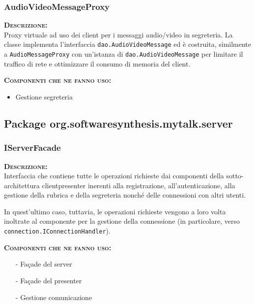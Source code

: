 \subsubsection{AudioVideoMessageProxy}
\begin{description}
	\item{\scshape\bfseries Descrizione:}\\
Proxy virtuale ad uso dei client per i messaggi audio/video in segreteria. La classe implementa l'interfaccia \texttt{dao.AudioVideoMessage} ed è costruita, similmente a \texttt{AudioMessageProxy} con un'istanza di \texttt{dao.AudioVideoMessage} per limitare il traffico di rete e ottimizzare il consumo di memoria del client.
	\item{\scshape\bfseries Componenti che ne fanno uso:}
	\begin{itemize}[noitemsep,nolistsep]
	  \item Gestione segreteria
	\end{itemize}
\end{description}

\subsection{Package org.softwaresynthesis.mytalk.server}
\subsubsection{IServerFacade}
\begin{description}
	\item{\scshape\bfseries Descrizione:}\\
Interfaccia che contiene tutte le operazioni richieste dai componenti della sotto-architettura clientpresenter inerenti alla registrazione, all'autenticazione,  alla gestione della rubrica e della segreteria nonché delle connessioni con altri utenti.

In quest'ultimo caso, tuttavia, le operazioni richieste vengono a loro volta inoltrate al componente per la gestione della connessione (in particolare, verso \texttt{connection.IConnectionHandler}).
	\item{\scshape\bfseries Componenti che ne fanno uso:}
	\begin{itemize}[noitemsep,nolistsep]
	  \item[-] Façade del server
	  \item[-] Façade del presenter
	  \item[-] Gestione comunicazione
	\end{itemize}
\end{description}

